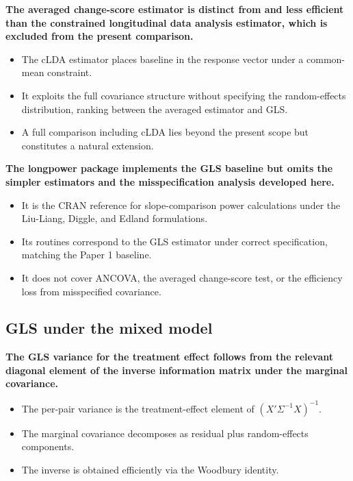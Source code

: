 \documentclass[
  11pt,
]{article}
\begin{document}
\textbf{The averaged change-score estimator is distinct from and less efficient than the constrained longitudinal data analysis estimator, which is excluded from the present comparison.}

\begin{itemize}\setlength{\itemsep}{2pt}\setlength{\parskip}{0pt}
\item The cLDA estimator places baseline in the response vector under a common-mean constraint.
\item It exploits the full covariance structure without specifying the random-effects distribution, ranking between the averaged estimator and GLS.
\item A full comparison including cLDA lies beyond the present scope but constitutes a natural extension.
\end{itemize}

\textbf{The longpower package implements the GLS baseline but omits the simpler estimators and the misspecification analysis developed here.}

\begin{itemize}\setlength{\itemsep}{2pt}\setlength{\parskip}{0pt}
\item It is the CRAN reference for slope-comparison power calculations under the Liu-Liang, Diggle, and Edland formulations.
\item Its routines correspond to the GLS estimator under correct specification, matching the Paper 1 baseline.
\item It does not cover ANCOVA, the averaged change-score test, or the efficiency loss from misspecified covariance.
\end{itemize}

\subsection{GLS under the mixed model}\label{gls-under-the-mixed-model}

\textbf{The GLS variance for the treatment effect follows from the relevant diagonal element of the inverse information matrix under the marginal covariance.}

\begin{itemize}\setlength{\itemsep}{2pt}\setlength{\parskip}{0pt}
\item The per-pair variance is the treatment-effect element of $(X'\Sigma^{-1}X)^{-1}$.
\item The marginal covariance decomposes as residual plus random-effects components.
\item The inverse is obtained efficiently via the Woodbury identity.
\end{itemize}
\end{document}
